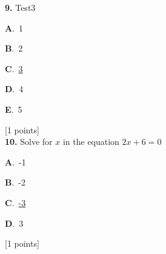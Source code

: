 \documentclass[12pt]{article}
\newcommand{\choice}[3]{%
  \noindent\textbf{#1}.~#2\hfill#3\par\vspace{0.25em}
}
\begin{document}
\noindent \textbf{\textenglish{9.}} {\textenglish{Test3}}

\noindent\choice{A}{{\textenglish{1}}}{}
\noindent\choice{B}{{\textenglish{2}}}{}
\noindent\choice{C}{\underline{{\textenglish{3}}}}{}
\noindent\choice{D}{{\textenglish{4}}}{}
\noindent\choice{E}{{\textenglish{5}}}{}
\hfill {\textenglish{[1 points]}}\\[0.5em]

\noindent \textbf{\textenglish{10.}} {\textenglish{Solve for }}\(x \){\textenglish{ in the equation }}\(2x+6 = 0 \)

\noindent\choice{A}{{\textenglish{-1}}}{}
\noindent\choice{B}{{\textenglish{-2}}}{}
\noindent\choice{C}{\underline{{\textenglish{-3}}}}{}
\noindent\choice{D}{{\textenglish{3}}}{}
\hfill {\textenglish{[1 points]}}\\[0.5em]
\end{document}

